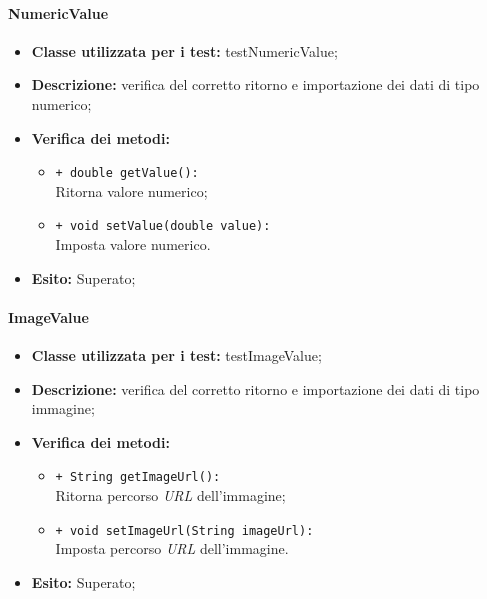 \paragraph{NumericValue}
\begin{flushleft}
\begin{itemize}
\item \textbf{Classe utilizzata per i test:} testNumericValue;
\item \textbf{Descrizione:} verifica del corretto ritorno e importazione dei dati di tipo numerico;
\item \textbf{Verifica dei metodi:}
\begin{sloppypar}
\begin{itemize}
\item \texttt{+ double getValue():}\\ Ritorna valore numerico;
\item \texttt{+ void setValue(double value):}\\ Imposta valore numerico.
\end{itemize}
\end{sloppypar}
\item \textbf{Esito:} Superato;
\end{itemize}
\end{flushleft}

\paragraph{ImageValue}
\begin{flushleft}
\begin{itemize}
\item \textbf{Classe utilizzata per i test:} testImageValue;
\item \textbf{Descrizione:} verifica del corretto ritorno e importazione dei dati di tipo immagine;
\item \textbf{Verifica dei metodi:}
\begin{sloppypar}
\begin{itemize}
\item \texttt{+ String getImageUrl():}\\ Ritorna percorso \textit{URL} dell'immagine;
\item \texttt{+ void setImageUrl(String imageUrl):}\\ Imposta percorso \textit{URL} dell'immagine.
\end{itemize}
\end{sloppypar}
\item \textbf{Esito:} Superato;
\end{itemize}
\end{flushleft}

